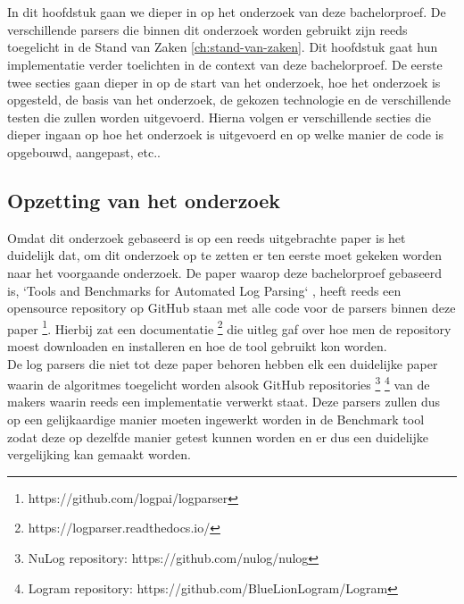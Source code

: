 
\chapter{}
\label{ch:methodologie}


In dit hoofdstuk gaan we dieper in op het onderzoek van deze bachelorproef. De verschillende parsers die binnen dit onderzoek worden gebruikt zijn reeds toegelicht in de Stand van Zaken \ref{ch:stand-van-zaken}. Dit hoofdstuk gaat hun implementatie verder toelichten in de context van deze bachelorproef. De eerste twee secties gaan dieper in op de start van het onderzoek, hoe het onderzoek is opgesteld, de basis van het onderzoek, de gekozen technologie en de verschillende testen die zullen worden uitgevoerd. Hierna volgen er verschillende secties die dieper ingaan op hoe het onderzoek is uitgevoerd en op welke manier de code is opgebouwd, aangepast, etc..


\section{Opzetting van het onderzoek}
Omdat dit onderzoek gebaseerd is op een reeds uitgebrachte paper is het duidelijk dat, om dit onderzoek op te zetten er ten eerste moet gekeken worden naar het voorgaande onderzoek. De paper waarop deze bachelorproef gebaseerd is, `Tools and Benchmarks for Automated Log Parsing` \autocite{TBA2019}, heeft reeds een opensource repository op GitHub staan met alle code voor de parsers binnen deze paper \footnote{https://github.com/logpai/logparser}. Hierbij zat een documentatie \footnote{https://logparser.readthedocs.io/} die uitleg gaf over hoe men de repository moest downloaden en installeren en hoe de tool gebruikt kon worden.\\

De log parsers die niet tot deze paper behoren hebben elk een duidelijke paper waarin de algoritmes toegelicht worden alsook GitHub repositories \footnote{NuLog repository: https://github.com/nulog/nulog} \footnote{Logram repository: https://github.com/BlueLionLogram/Logram} van de makers waarin reeds een implementatie verwerkt staat. Deze parsers zullen dus op een gelijkaardige manier moeten ingewerkt worden in de Benchmark tool zodat deze op dezelfde manier getest kunnen worden en er dus een duidelijke vergelijking kan gemaakt worden.\\

